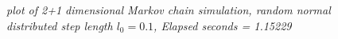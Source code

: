 \documentclass[english,a4paper,12pt]{article}
\begin{document}
\subsection*{}
\begin{figure}[H]
 \begin{center}
 \end{center}
 \caption{\textit{plot of 2+1 dimensional Markov chain simulation, random normal distributed step length $l_0 = 0.1$, Elapsed seconds =  1.15229}}
 \label{fig:edge}
\end{figure}
\end{document}
